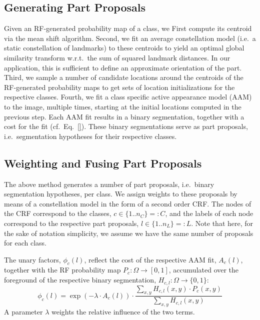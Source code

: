 \documentclass[10pt,twocolumn,letterpaper]{article}
\begin{document}
\subsection{Generating Part Proposals}
\label{subsec:hyps}
%
Given an RF-generated probability map of a class, we
First compute its centroid via the mean shift algorithm. 
%
Second, we fit an average constellation model (i.e.\ a static constellation of landmarks) to these centroids to yield an optimal global similarity transform w.r.t.\ the sum of squared landmark distances. In our application, this is sufficient to define an approximate orientation of the part. 
%
Third, we sample a number of candidate locations around the centroids of the RF-generated probability maps to get sets of location initializations for the respective classes. 
%
Fourth, we fit a class specific active appearance model (AAM) to the image, multiple times, starting at the initial locations computed in the previous step. 
%
Each AAM fit results in a binary segmentation, together with a cost for the fit (cf.\ Eq.\ \eqref{}). 
%
These binary segmentations serve as part proposals, i.e.\ segmentation hypotheses for their respective classes. 

\subsection{Weighting and Fusing Part Proposals}
\label{subsec:weightsAndFusion}

The above method generates a number of part proposals, i.e.\ binary segmentation hypotheses, per class. 
%
We assign weights to these proposals by means of a constellation model in the form of a second order CRF. 
%
The nodes of the CRF correspond to the classes, $c\in \{1..n_C\}=:C$, and the labels of each node correspond to the respective part proposals, $l\in \{1..n_L\}=:L$. 
Note that here, for the sake of notation simplicity, we assume we have the same number of proposals for each class. 

The unary factors, $\phi_c(l)$, reflect the cost of the respective AAM fit, $A_c(l)$, together with the RF probability map $P_c:\Omega\rightarrow [ 0,1 ]$, accumulated over the foreground of the respective binary segmentation, $H_{c,l}: \Omega\rightarrow \{0,1\}$: 
\begin{equation}
\phi_c(l) = \exp{(-\lambda\cdot A_c(l))} \cdot \frac{\sum_{x,y} H_{c,l}(x,y)\cdot P_c(x,y)}{\sum_{x,y} H_{c,l}(x,y)}
\label{eq:unaries}
\end{equation}
A parameter $\lambda$ weights the relative influence of the two terms. 
\end{document}
